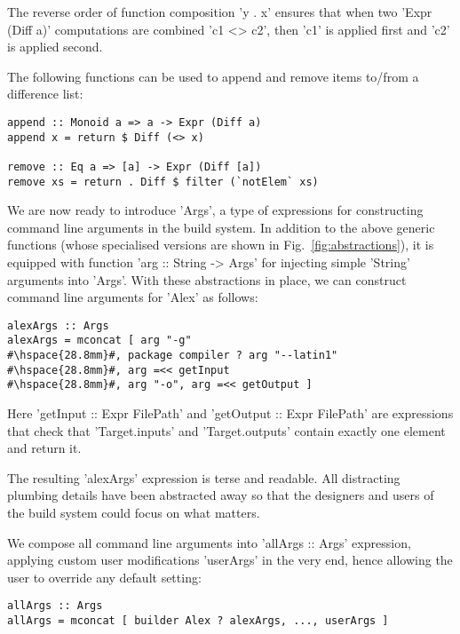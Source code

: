 \noindent The reverse order of function composition \lst'y . x' ensures that
when two \lst'Expr (Diff a)' computations are combined \lst'c1 <> c2', then
\lst'c1' is applied first and \lst'c2' is applied second.

The following functions can be used to append and remove items to/from a
difference list:

\begin{lstlisting}
append :: Monoid a => a -> Expr (Diff a)
append x = return $ Diff (<> x)

remove :: Eq a => [a] -> Expr (Diff [a])
remove xs = return . Diff $ filter (`notElem` xs)
\end{lstlisting}

We are now ready to introduce \lst'Args', a type of expressions for
constructing command line arguments in the build system. In addition to the
above generic functions (whose specialised versions are shown in
Fig.~\ref{fig:abstractions}), it is equipped with function
\lst'arg :: String -> Args' for injecting simple \lst'String' arguments into
\lst'Args'. With these abstractions in place, we can construct command line
arguments for \lst'Alex' as follows:

\begin{lstlisting}
alexArgs :: Args
alexArgs = mconcat [ arg "-g"
#\hspace{28.8mm}#, package compiler ? arg "--latin1"
#\hspace{28.8mm}#, arg =<< getInput
#\hspace{28.8mm}#, arg "-o", arg =<< getOutput ]
\end{lstlisting}

\noindent Here \lst'getInput :: Expr FilePath' and
\lst'getOutput :: Expr FilePath' are expressions that check that
\lst'Target.inputs' and \lst'Target.outputs' contain exactly one element and
return it.

The resulting \lst'alexArgs' expression is terse and readable. All
distracting plumbing details have been abstracted away so that the designers and
users of the build system could focus on what matters. 

We compose all command line arguments into \lst'allArgs :: Args' expression,
applying custom user modifications \lst'userArgs' in the very end, hence
allowing the user to override any default setting:

\begin{lstlisting}
allArgs :: Args
allArgs = mconcat [ builder Alex ? alexArgs, ..., userArgs ]
\end{lstlisting}

